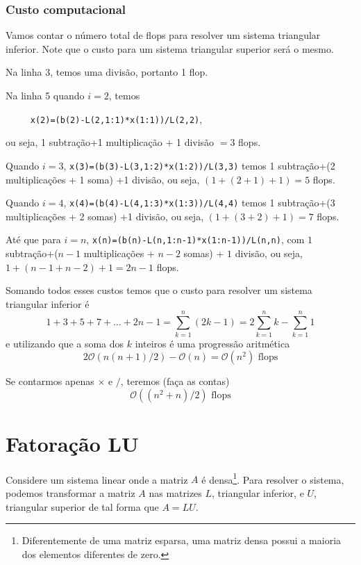 \subsubsection{Custo computacional}
Vamos contar o número total de flops para resolver um sistema triangular inferior. Note que o custo para um sistema triangular superior será o mesmo.

Na linha 3, temos uma divisão, portanto 1 flop.

Na linha 5 quando $i=2$, temos

\verb#     x(2)=(b(2)-L(2,1:1)*x(1:1))/L(2,2)#,

ou seja, 1 subtração+1 multiplicação + 1 divisão $=3$ flops.

Quando $i=3$, \verb#x(3)=(b(3)-L(3,1:2)*x(1:2))/L(3,3)# temos 1 subtração+(2 multiplicações + 1 soma) +1 divisão, ou seja, $(1+(2+1)+1)=5$ flops.

Quando $i=4$, \verb#x(4)=(b(4)-L(4,1:3)*x(1:3))/L(4,4)# temos 1 subtração+(3 multiplicações + 2 somas) +1 divisão, ou seja, $(1+(3+2)+1)=7$ flops.

Até que para $i=n$, \verb#x(n)=(b(n)-L(n,1:n-1)*x(1:n-1))/L(n,n)#, com $1$ subtração+($n-1$ multiplicações + $n-2$ somas) + $1$ divisão, ou seja, $1+(n-1+n-2)+1=2n-1$ flops.

Somando todos esses custos temos que o custo para resolver um sistema triangular inferior é
\begin{equation}
  1 +3+5+7+...+2n-1=  \sum_{k=1}^n(2k-1) = 2 \sum_{k=1}^nk -\sum_{k=1}^n1
\end{equation}
e utilizando que a soma dos $k$ inteiros é uma progressão aritmética
\begin{equation}
  2 \mathcal{O}(  n(n+1)/2 ) -\mathcal{O}(n)= \mathcal{O}(n^2) \text{~flops}
\end{equation}

Se contarmos apenas $\times$ e $/$, teremos (faça as contas)
\begin{equation}
  \mathcal{O}( (n^2+n)/2 ) \text{~flops}
\end{equation}


\section{Fatoração LU}
Considere um sistema linear onde a matriz $A$ é densa\footnote{Diferentemente de uma matriz esparsa, uma matriz densa possui a maioria dos elementos diferentes de zero.}. Para resolver o sistema, podemos transformar a matriz $A$ nas matrizes $L$, triangular inferior, e $U$, triangular superior de tal forma que $A=LU$.

